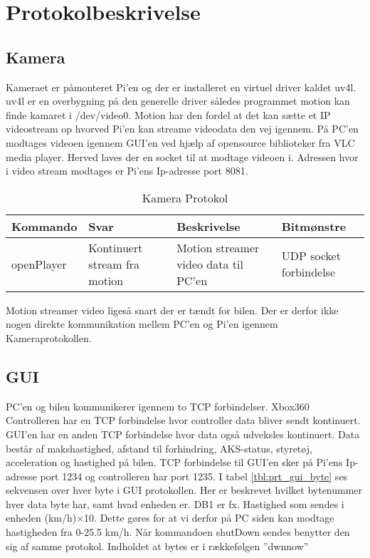 \section{Protokolbeskrivelse}

\subsection{Kamera}

Kameraet er påmonteret Pi'en og der er installeret en virtuel driver kaldet uv4l. uv4l er en overbygning på den generelle driver således programmet motion kan finde kamaret i /dev/video0. Motion har den fordel at det kan sætte et IP videostream op hvorved Pi’en kan streame videodata den vej igennem. På PC'en modtages videoen igennem GUI'en ved hjælp af opensource biblioteker fra VLC media player. Herved laves der en socket til at modtage videoen i. Adressen hvor i video stream modtages er Pi'ens Ip-adresse port 8081.

\begin{table}[ht]
	\begin{tabularx}{\textwidth}{| Z | Z | Z | Z |} \hline
		\textbf{Kommando} 						&
		\textbf{Svar}							&
		\textbf{Beskrivelse}					&
		\textbf{Bitmønstre}						\\ \hline

		openPlayer								&
		Kontinuert stream fra motion			&
		Motion streamer video data til PC'en	&
		UDP socket forbindelse					\\ \hline

		\end{tabularx}
	\caption{Kamera Protokol}
	\label{tbl:prt_cam}
\end{table}

Motion streamer video ligeså snart der er tændt for bilen. Der er derfor ikke nogen direkte kommunikation mellem PC'en og Pi'en igennem Kameraprotokollen.


\subsection{GUI}

PC'en og bilen kommunikerer igennem to TCP forbindelser. Xbox360 Controlleren har en TCP forbindelse hvor controller data bliver sendt kontinuert. GUI'en har en anden TCP forbindelse hvor data også udveksles kontinuert. Data består af makshastighed, afstand til forhindring, AKS-status,  styretøj, acceleration og hastighed på bilen. TCP forbindelse til GUI'en sker på Pi'ens Ip-adresse port 1234 og controlleren har port 1235.
I tabel \ref{tbl:prt_gui_byte} ses sekvensen over hver byte i GUI protokollen. Her er beskrevet hvilket bytenummer hver data byte har, samt hvad enheden er. DB1 er fx. Hastighed som sendes i enheden (km/h)$\times$10. Dette gøres for at vi derfor på PC siden kan modtage hastigheden fra 0-25.5 km/h. Når kommandoen shutDown sendes benytter den sig af samme protokol. Indholdet at bytes er i rækkefølgen ''dwnnow''

